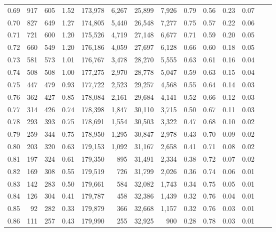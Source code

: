 \begin{tabular}{rrrrrrrrrrrrrr}
0.69 &    917 &  605 &    1.52 &  173,978 &    6,267 &  25,899 &   7,926 &  0.79 &  0.56 &  0.23 &      0.07 \\
0.70 &    827 &  649 &    1.27 &  174,805 &    5,440 &  26,548 &   7,277 &  0.75 &  0.57 &  0.22 &      0.06 \\
0.71 &    721 &  600 &    1.20 &  175,526 &    4,719 &  27,148 &   6,677 &  0.71 &  0.59 &  0.20 &      0.05 \\
0.72 &    660 &  549 &    1.20 &  176,186 &    4,059 &  27,697 &   6,128 &  0.66 &  0.60 &  0.18 &      0.05 \\
0.73 &    581 &  573 &    1.01 &  176,767 &    3,478 &  28,270 &   5,555 &  0.63 &  0.61 &  0.16 &      0.04 \\
0.74 &    508 &  508 &    1.00 &  177,275 &    2,970 &  28,778 &   5,047 &  0.59 &  0.63 &  0.15 &      0.04 \\
0.75 &    447 &  479 &    0.93 &  177,722 &    2,523 &  29,257 &   4,568 &  0.55 &  0.64 &  0.14 &      0.03 \\
0.76 &    362 &  427 &    0.85 &  178,084 &    2,161 &  29,684 &   4,141 &  0.52 &  0.66 &  0.12 &      0.03 \\
0.77 &    314 &  426 &    0.74 &  178,398 &    1,847 &  30,110 &   3,715 &  0.50 &  0.67 &  0.11 &      0.03 \\
0.78 &    293 &  393 &    0.75 &  178,691 &    1,554 &  30,503 &   3,322 &  0.47 &  0.68 &  0.10 &      0.02 \\
0.79 &    259 &  344 &    0.75 &  178,950 &    1,295 &  30,847 &   2,978 &  0.43 &  0.70 &  0.09 &      0.02 \\
0.80 &    203 &  320 &    0.63 &  179,153 &    1,092 &  31,167 &   2,658 &  0.41 &  0.71 &  0.08 &      0.02 \\
0.81 &    197 &  324 &    0.61 &  179,350 &      895 &  31,491 &   2,334 &  0.38 &  0.72 &  0.07 &      0.02 \\
0.82 &    169 &  308 &    0.55 &  179,519 &      726 &  31,799 &   2,026 &  0.36 &  0.74 &  0.06 &      0.01 \\
0.83 &    142 &  283 &    0.50 &  179,661 &      584 &  32,082 &   1,743 &  0.34 &  0.75 &  0.05 &      0.01 \\
0.84 &    126 &  304 &    0.41 &  179,787 &      458 &  32,386 &   1,439 &  0.32 &  0.76 &  0.04 &      0.01 \\
0.85 &     92 &  282 &    0.33 &  179,879 &      366 &  32,668 &   1,157 &  0.32 &  0.76 &  0.03 &      0.01 \\
0.86 &    111 &  257 &    0.43 &  179,990 &      255 &  32,925 &     900 &  0.28 &  0.78 &  0.03 &      0.01 \\

\end{tabular}
